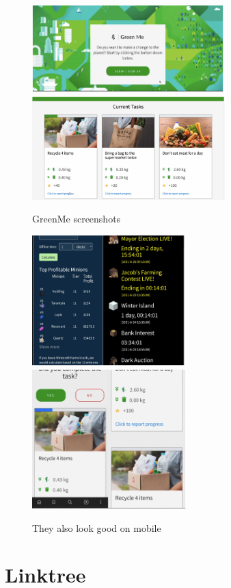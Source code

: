 \begin{figure}[H]
\centering
\includegraphics[width=7.5cm]{images/chn0-code-greenme-0.png}
\includegraphics[width=7.5cm]{images/chn0-code-greenme-3.png}
\caption{GreenMe screenshots}
\end{figure}

\begin{figure}[H]
\centering
\includegraphics[width=6cm]{images/chn0-code-hyminions-4.png}
\includegraphics[width=6cm]{images/chn0-code-greenme-6.png}
\caption{They also look good on mobile}
\end{figure}

\newpage
\section{Linktree}

